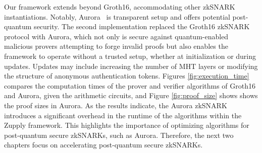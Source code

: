  Our framework extends beyond Groth16, accommodating other zkSNARK instantiations. Notably, Aurora~\cite{Aurora2019} is transparent setup and offers potential post-quantum security.
The second implementation replaced the Groth16 zkSNARK protocol with Aurora, which not only is secure against quantum-enabled malicious provers attempting to forge invalid proofs but also enables the framework to operate without a trusted setup, whether at initialization or during updates. Updates may include increasing the number of \textsf{MHT} layers or modifying the structure of anonymous authentication tokens. Figures \ref{fig:execution_time} compares the computation times of the prover and verifier algorithms of Groth16 and Aurora, given the arithmetic circuits, and Figure \ref{fig:proof_size} shows shows the proof sizes in Aurora.  As the results indicate, the Aurora zkSNARK introduces a significant overhead in the runtime of the algorithms within the Zupply framework. This highlights the importance of optimizing algorithms for post-quantum secure zkSNARKs, such as Aurora. Therefore, the next two chapters focus on accelerating post-quantum secure zkSNARKs.









 
